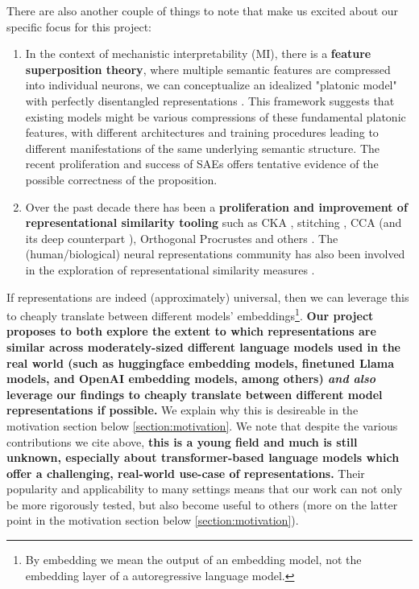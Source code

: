 \documentclass[9pt,letterpaper]{article}
\begin{document}
There are also another couple of things to note that make us excited about our specific focus for this project:
\begin{enumerate}
    \item In the context of mechanistic interpretability (MI), there is a \textbf{feature superposition theory}, where multiple semantic features are compressed into individual neurons, we can conceptualize an idealized "platonic model" with perfectly disentangled representations \cite{anthropic}. This framework suggests that existing models might be various compressions of these fundamental platonic features, with different architectures and training procedures leading to different manifestations of the same underlying semantic structure. The recent proliferation and success of SAEs \cite{cunningham_sparse_2023} offers tentative evidence of the possible correctness of the proposition.
    \item Over the past decade there has been a \textbf{proliferation and improvement of representational similarity tooling} such as CKA \cite{kornblith_similarity_2019}, stitching \cite{bansal_revisiting_2021}, CCA \cite{noauthor_canonical_2024} (and its deep counterpart \cite{andrew_deep_2013}), Orthogonal Procrustes and others \cite{box-rep-sim}. The (human/biological) neural representations community has also been involved in the exploration of representational similarity measures \cite{haxby_decoding_2014} \cite{kriegeskorte_representational_2008} \cite{yousefnezhad_deep_2021}.
\end{enumerate}

If representations are indeed (approximately) universal, then we can leverage this to cheaply translate between different models' embeddings\footnote{By embedding we mean the output of an embedding model, not the embedding layer of a autoregressive language model.}. \textbf{Our project proposes to both explore the extent to which representations are similar across moderately-sized different language models used in the real world (such as huggingface embedding models, finetuned Llama models, and OpenAI embedding models, among others) \textit{and also} leverage our findings to cheaply translate between different model representations if possible.} We explain why this is desireable in the motivation section below \ref{section:motivation}. We note that despite the various contributions we cite above, \textbf{this is a young field and much is still unknown, especially about transformer-based language models which offer a challenging, real-world use-case of representations.} Their popularity and applicability to many settings means that our work can not only be more rigorously tested, but also become useful to others (more on the latter point in the motivation section below \ref{section:motivation}).
\end{document}
